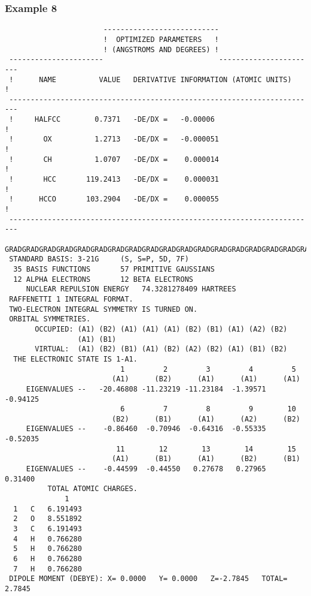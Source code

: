\subsubsection{\sf Example 8}
{\small
\begin{verbatim}
                       ---------------------------
                       !  OPTIMIZED PARAMETERS   !
                       ! (ANGSTROMS AND DEGREES) !
 ----------------------                           -----------------------
 !      NAME          VALUE   DERIVATIVE INFORMATION (ATOMIC UNITS)     !
 ------------------------------------------------------------------------
 !     HALFCC        0.7371   -DE/DX =   -0.00006                       !
 !       OX          1.2713   -DE/DX =   -0.000051                      !
 !       CH          1.0707   -DE/DX =    0.000014                      !
 !       HCC       119.2413   -DE/DX =    0.000031                      !
 !      HCCO       103.2904   -DE/DX =    0.000055                      !
 ------------------------------------------------------------------------
 GRADGRADGRADGRADGRADGRADGRADGRADGRADGRADGRADGRADGRADGRADGRADGRADGRADGRAD
 STANDARD BASIS: 3-21G     (S, S=P, 5D, 7F)
  35 BASIS FUNCTIONS       57 PRIMITIVE GAUSSIANS
  12 ALPHA ELECTRONS       12 BETA ELECTRONS
     NUCLEAR REPULSION ENERGY   74.3281278409 HARTREES
 RAFFENETTI 1 INTEGRAL FORMAT.
 TWO-ELECTRON INTEGRAL SYMMETRY IS TURNED ON.
 ORBITAL SYMMETRIES.
       OCCUPIED: (A1) (B2) (A1) (A1) (A1) (B2) (B1) (A1) (A2) (B2)
                 (A1) (B1)
       VIRTUAL:  (A1) (B2) (B1) (A1) (B2) (A2) (B2) (A1) (B1) (B2)
  THE ELECTRONIC STATE IS 1-A1.
                           1         2         3         4         5
                         (A1)      (B2)      (A1)      (A1)      (A1)
     EIGENVALUES --   -20.46808 -11.23219 -11.23184  -1.39571  -0.94125
                           6         7         8         9        10
                         (B2)      (B1)      (A1)      (A2)      (B2)
     EIGENVALUES --    -0.86460  -0.70946  -0.64316  -0.55335  -0.52035
                          11        12        13        14        15
                         (A1)      (B1)      (A1)      (B2)      (B1)
     EIGENVALUES --    -0.44599  -0.44550   0.27678   0.27965   0.31400
          TOTAL ATOMIC CHARGES.
              1
  1   C   6.191493
  2   O   8.551892
  3   C   6.191493
  4   H   0.766280
  5   H   0.766280
  6   H   0.766280
  7   H   0.766280
 DIPOLE MOMENT (DEBYE): X= 0.0000   Y= 0.0000   Z=-2.7845   TOTAL= 2.7845
\end{verbatim}
}
\newpage

